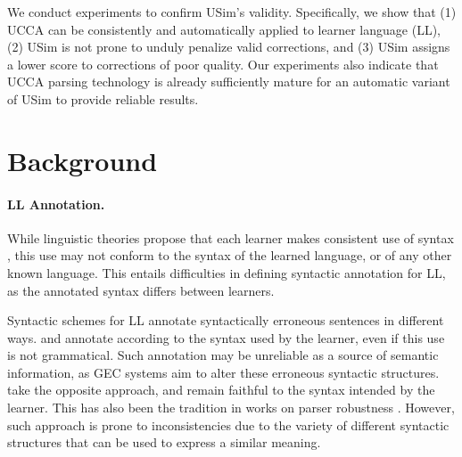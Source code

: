 \documentclass[a4paper, 11pt]{article}
\newcommand{\lc}[1]{\footnote{\color{blue}LC: #1}}
\begin{document}


We conduct experiments to confirm {\sc USim}'s validity.
Specifically, we show that
(1) UCCA can be consistently and automatically applied to learner language (LL), 
(2) {\sc USim} is not prone to unduly penalize valid corrections, and 
(3) {\sc USim} assigns a lower score to corrections of poor quality.
Our experiments also indicate that UCCA parsing technology is already sufficiently mature for an automatic variant of {\sc USim} to provide reliable results.


\section{Background}


\paragraph{LL Annotation.}
While linguistic theories propose that each learner makes consistent use of syntax 
\cite{huebner1985system,tarone1983variability}, this use may not conform to the syntax of the learned language, 
or of any other known language. This entails difficulties in defining syntactic annotation for LL, as the annotated syntax differs between learners.

Syntactic schemes for LL annotate syntactically erroneous sentences in different ways.
 and  annotate according 
to the syntax used by the learner, even if this use is not grammatical.
Such annotation may be unreliable as a source of semantic information, 
as GEC systems aim to alter these erroneous syntactic structures.
 take the opposite approach, and remain faithful to the syntax intended by the learner.
This has also been the tradition in works on parser robustness 
\cite{bigert2005unsupervised,foster2004parsing}. However, such approach is prone to inconsistencies due to the 
variety of different syntactic structures that can be used to express a similar meaning. 
\end{document}
